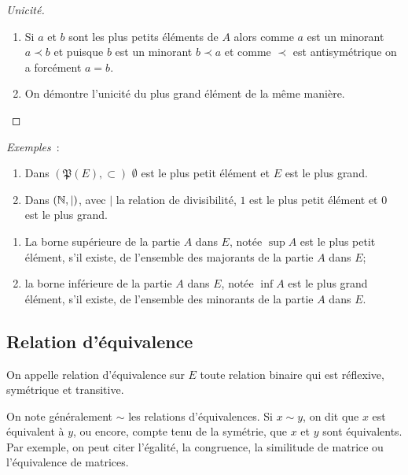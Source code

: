 \begin{proof}[Unicité]
  \begin{enumerate}
    \item Si \(a\) et \(b\) sont les plus petits éléments de \(A\) alors 
      comme \(a\) est un minorant \(a \prec b\) et puisque \(b\) est un 
      minorant \(b \prec a\) et comme \(\prec\) est antisymétrique on a 
      forcément \(a = b\).
    \item On démontre l'unicité du plus grand élément de la même manière.
  \end{enumerate}
\end{proof}

\emph{Exemples}~:
\begin{enumerate}
  \item Dans \((\mathfrak{P}(E), \subset)\) \(\emptyset\) est le plus petit 
    élément et \(E\) est le plus grand.
  \item Dans \((\mathbb{N},|)\), avec \(|\) la relation de divisibilité, \(1\) est le 
    plus petit élément et \(0\) est le plus grand.
\end{enumerate}

\begin{defdef}
  \begin{enumerate}
    \item La borne supérieure de la partie \(A\) dans \(E\), notée \(\sup 
      A\) est le plus petit élément, s'il existe, de l'ensemble des 
      majorants de la partie \(A\) dans \(E\);
    \item la borne inférieure de la partie \(A\) dans \(E\), notée \(\inf 
      A\) est le plus grand élément, s'il existe, de l'ensemble des 
      minorants de la partie \(A\) dans \(E\).
  \end{enumerate}
\end{defdef}

\subsection{Relation d'équivalence}
\label{chap3-subsec:relationequivalence}
\begin{defdef}
  On appelle relation d'équivalence sur \(E\) toute relation binaire qui est 
  réflexive, symétrique et transitive.
\end{defdef}

On note généralement \(\sim\) les relations d'équivalences. Si \(x \sim y\), on 
dit que \(x\) est équivalent à \(y\), ou encore, compte tenu de la symétrie, que 
\(x\) et \(y\) sont équivalents. Par exemple, on peut citer l'égalité, la 
congruence, la similitude de matrice ou l'équivalence de matrices.

